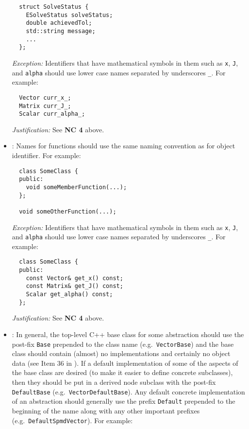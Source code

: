 \begin{itemize}
{\small\begin{verbatim}
  struct SolveStatus {
    ESolveStatus solveStatus;
    double achievedTol;
    std::string message;
    ...
  };
\end{verbatim}}


{}\textit{Exception:} Identifiers that have mathematical symbols in them such
as {}\texttt{x}, {}\texttt{J}, and {}\texttt{alpha} should use lower case
names separated by underscores {}\texttt{\_}.  For example:

{\small\begin{verbatim}
  Vector curr_x_;
  Matrix curr_J_;
  Scalar curr_alpha_;
\end{verbatim}}

{}\textit{Justification:} See {}\textbf{NC 4} above.


{}\item\NCFunctionNames: Names for functions should use the same naming
convention as for object identifier.  For example:

{\small\begin{verbatim}
  class SomeClass {
  public:
    void someMemberFunction(...);
  };

  void someOtherFunction(...);
\end{verbatim}}


{}\textit{Exception:} Identifiers that have mathematical symbols in them such
as {}\texttt{x}, {}\texttt{J}, and {}\texttt{alpha} should use lower case
names separated by underscores {}\texttt{\_}.  For example:

{\small\begin{verbatim}
  class SomeClass {
  public:
    const Vector& get_x() const;
    const Matrix& get_J() const;
    Scalar get_alpha() const;
  };
\end{verbatim}}


{}\textit{Justification:} See {}\textbf{NC 4} above.


{}\item\NCBaseDefaultClassNames: In general, the top-level C++ base
class for some abstraction should use the post-fix {}\texttt{Base}
prepended to the class name (e.g.\ {}\texttt{Vector\-Base}) and the
base class should contain (almost) no implementations and certainly no
object data (see Item 36 in {}\cite{C++CodingStandards05}).  If a
default implementation of some of the aspects of the base class are
desired (to make it easier to define concrete subclasses), then they
should be put in a derived node subclass with the post-fix
{}\texttt{DefaultBase} (e.g.\ {}\texttt{Vector\-Default\-Base}).  Any
default concrete implementation of an abstraction should generally use
the prefix {}\texttt{Default} prepended to the beginning of the name
along with any other important prefixes (e.g.\
{}\texttt{DefaultSpmdVector}).  For example:


\end{itemize}
